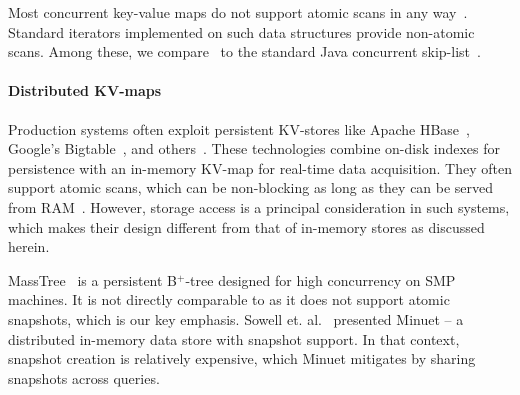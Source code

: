 Most concurrent key-value maps do not support atomic  scans in any
way~\cite{JavaConcurrentSkipList,LinkedListBP,BraginskyP2012,Hendler04,NatarajanM2014,Kogan12,Lomet13}.
Standard iterators implemented on such data structures provide non-atomic scans. Among these, we compare \kiwi\ to the standard Java 
concurrent skip-list~\cite{Fraser04}.

\paragraph{Distributed KV-maps}
Production systems often exploit persistent KV-stores like Apache HBase~\cite{ApacheHBase},  Google's Bigtable~\cite{Chang2008}, 
and others~\cite{leveldb, RocksDB}. These technologies combine on-disk indexes for persistence with an in-memory KV-map 
for real-time data acquisition. They often support atomic scans, which can be non-blocking as long as they can be served from 
RAM~\cite{GolanGueta2015}. However, storage access is a principal consideration in such systems, which makes their design 
different from that of in-memory stores as discussed herein.

MassTree~\cite{Mao:2012} is a persistent B$^{+}$-tree designed for high concurrency on SMP 
machines. It is not directly comparable to {\kiwi} as it does not support atomic snapshots, which is our key emphasis. 
Sowell et. al.~\cite{Sowell:2012} presented Minuet -- a distributed in-memory data store with snapshot support. 
In that context, snapshot creation is relatively expensive, which Minuet mitigates by sharing snapshots across queries. 



